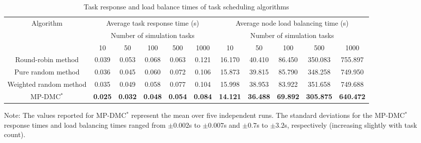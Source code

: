 \documentclass[twoside,twocolumn]{article}
\begin{document}
\begin{table}[b]
	\centering
	\small
	\caption{Task response and load balance times of task scheduling algorithms}
	\label{Table:3}
	\begin{tabular*}{\textwidth}{@{\extracolsep{\fill}} ccccccccccc}
	\toprule[0.75pt]
	\multirow{3}{*}{Algorithm} 
	& \multicolumn{5}{c}{Average task response time (s)} 
	& \multicolumn{5}{c}{Average node load balancing time (s)} \\
	\cmidrule(lr){2-11}
	& \multicolumn{5}{c}{Number of simulation tasks} 
	& \multicolumn{5}{c}{Number of simulation tasks} \\
	\cmidrule(lr){2-11}
	& 10 & 50 & 100 & 500 & 1000 
	& 10 & 50 & 100 & 500 & 1000 \\
	\midrule[0.5pt]
	Round-robin method 
	& 0.039 & 0.053 & 0.068 & 0.063 & 0.121 
	& 16.170 & 40.410 & 86.450 & 350.083 & 755.897 \\
	Pure random method 
	& 0.036 & 0.045 & 0.060 & 0.072 & 0.106 
	& 15.873 & 39.815 & 85.790 & 348.258 & 749.950 \\
	Weighted random method 
	& 0.035 & 0.049 & 0.058 & 0.077 & 0.104 
	& 15.998 & 38.953 & 83.922 & 351.658 & 749.688 \\
	MP-DMC$^*$ 
	& \textbf{0.025} & \textbf{0.032} & \textbf{0.048} & \textbf{0.054} & \textbf{0.084} 
	& \textbf{14.121} & \textbf{36.488} & \textbf{69.892} & \textbf{305.875} & \textbf{640.472} \\
	\bottomrule[0.75pt]
	\end{tabular*}
	\vspace{0.4em}
	\parbox{\textwidth}{\footnotesize Note: The values reported for MP-DMC$^*$ represent the mean over five independent runs. The standard deviations for the MP-DMC$^*$ response times and load balancing times ranged from $\pm 0.002$s to $\pm 0.007$s and $\pm 0.7$s to $\pm 3.2$s, respectively (increasing slightly with task count).}
	\end{table}
\end{document}
